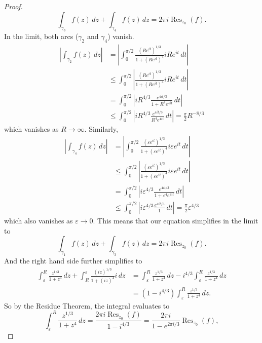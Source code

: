 \documentclass{article}
\begin{document}
\begin{proof}
\[    \int_{\gamma_3} f(z)\,dz +
    \int_{\gamma_4} f(z)\,dz =
    2\pi i \operatorname{Res}_{z_0}(f).
  \]
  In the limit, both arcs ($\gamma_2$ and $\gamma_4$) vanish.
  \begin{align*}
    \left|\int_{\gamma_2}f(z)\,dz\right|
    &= \left|
      \int_0^{\pi/2}\frac{(Re^{it})^{1/3}}{1 + {(Re^{it})^4}}iRe^{it}\,dt
    \right|\\
    &\leq \int_0^{\pi/2}\left|
      \frac{(Re^{it})^{1/3}}{1 + {(Re^{it})^4}}iRe^{it}\,dt
    \right| \\
    &= \int_0^{\pi/2}\left|
      iR^{4/3}\frac{e^{4it/3}}{1 + {R^4e^{4it}}}\,dt
    \right| \\
    &\leq \int_0^{\pi/2}\left|
      iR^{4/3}\frac{e^{4it/3}}{{R^4e^{4it}}}\,dt
    \right| = \frac{\pi}{2}R^{-8/3}
  \end{align*} which vanishes as $R \rightarrow \infty$.
  Similarly, \begin{align*}
    \left|\int_{\gamma_4}f(z)\,dz\right|
    &= \left|
      \int_0^{\pi/2}\frac{(\varepsilon e^{it})^{1/3}}{1 + {(\varepsilon e^{it})^4}}i\varepsilon e^{it}\,dt
    \right|\\
    &\leq \int_0^{\pi/2}\left|
      \frac{(\varepsilon e^{it})^{1/3}}{1 + {(\varepsilon e^{it})^4}}i\varepsilon e^{it}\,dt
    \right| \\
    &= \int_0^{\pi/2}\left|
      i\varepsilon ^{4/3}\frac{e^{4it/3}}{1 + {\varepsilon ^4e^{4it}}}\,dt
    \right| \\
    &\leq \int_0^{\pi/2}\left|
      i\varepsilon ^{4/3}\frac{e^{4it/3}}{1}\,dt
    \right| = \frac{\pi}{2}\varepsilon ^{4/3}
  \end{align*} which also vanishes as $\varepsilon \rightarrow 0$.
  This means that our equation simplifies in the limit to \[
    \int_{\gamma_1} f(z)\,dz +
    \int_{\gamma_3} f(z)\,dz =
    2\pi i \operatorname{Res}_{z_0}(f).
  \] And the right hand side further simplifies to \begin{align*}
    \int_\varepsilon^R\frac{z^{1/3}}{1 + {z^4}}\,dz +
    \int_R^\varepsilon\frac{(iz)^{1/3}}{1 + {(iz)^4}}i\,dz &=
    \int_\varepsilon^R\frac{z^{1/3}}{1 + {z^4}}\,dz -
    i^{4/3}\int_\varepsilon^R\frac{z^{1/3}}{1 + {z^4}}\,dz\\
    &= (1 - i^{4/3}) \int_\varepsilon^R\frac{z^{1/3}}{1 + {z^4}}\,dz.
  \end{align*}
  So by the Residue Theorem, the integral evaluates to \[
    \int_\varepsilon^R\frac{z^{1/3}}{1 + {z^4}}\,dz
    = \frac{2\pi i\operatorname{Res}_{z_0}(f)}{1 - i^{4/3}}
    = \frac{2\pi i}{1 - e^{2\pi i/3}}\operatorname{Res}_{z_0}(f),
\]
\end{proof}
\end{document}
